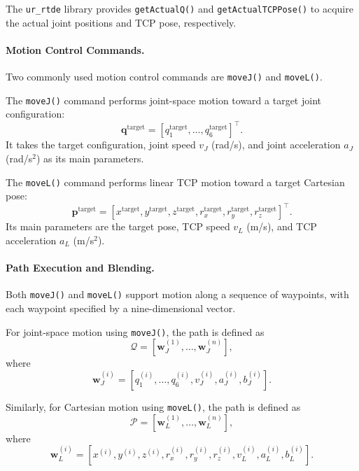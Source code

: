 \documentclass[11pt,a4paper]{article}
\begin{document}
The \texttt{ur\_rtde} library provides \texttt{getActualQ()} and \texttt{getActualTCPPose()} to acquire the actual joint positions and TCP pose, respectively.

\paragraph{Motion Control Commands.}
Two commonly used motion control commands are \texttt{moveJ()} and \texttt{moveL()}.

The \texttt{moveJ()} command performs joint-space motion toward a target joint configuration:
\begin{equation}
    \mathbf{q}^{\mathrm{target}} = [q_1^{\mathrm{target}},\ldots,q_6^{\mathrm{target}}]^\top.
\end{equation}
It takes the target configuration, joint speed $v_J$ (rad/s), and joint acceleration $a_J$ (rad/s$^2$) as its main parameters.

The \texttt{moveL()} command performs linear TCP motion toward a target Cartesian pose:
\begin{equation}
    \mathbf{p}^{\mathrm{target}} = [x^{\mathrm{target}},y^{\mathrm{target}},z^{\mathrm{target}},r_x^{\mathrm{target}},r_y^{\mathrm{target}},r_z^{\mathrm{target}}]^\top.
\end{equation}
Its main parameters are the target pose, TCP speed $v_L$ (m/s), and TCP acceleration $a_L$ (m/s$^2$).

\paragraph{Path Execution and Blending.}
Both \texttt{moveJ()} and \texttt{moveL()} support motion along a sequence of waypoints, with each waypoint specified by a nine-dimensional vector.

For joint-space motion using \texttt{moveJ()}, the path is defined as
\begin{equation}
    \mathcal{Q} = [\mathbf{w}_J^{(1)},\ldots,\mathbf{w}_J^{(n)}],
\end{equation}
where
\begin{equation}
    \mathbf{w}_J^{(i)} = [q_1^{(i)},\ldots,q_6^{(i)},v_J^{(i)},a_J^{(i)},b_J^{(i)}].
\end{equation}

Similarly, for Cartesian motion using \texttt{moveL()}, the path is defined as
\begin{equation}
    \mathcal{P} = [\mathbf{w}_L^{(1)},\ldots,\mathbf{w}_L^{(n)}],
\end{equation}
where
\begin{equation}
    \mathbf{w}_L^{(i)} = [x^{(i)},y^{(i)},z^{(i)},r_x^{(i)},r_y^{(i)},r_z^{(i)},v_L^{(i)},a_L^{(i)},b_L^{(i)}].
\end{equation}
\end{document}

